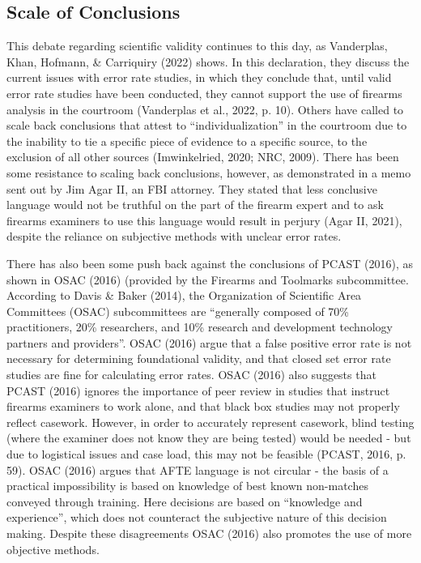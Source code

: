 \documentclass[print]{nuthesis}
\begin{document}
\hypertarget{scale-of-conclusions}{%
\subsection{Scale of Conclusions}\label{scale-of-conclusions}}

This debate regarding scientific validity continues to this day, as Vanderplas, Khan, Hofmann, \& Carriquiry (2022) shows.
In this declaration, they discuss the current issues with error rate studies, in which they conclude that, until valid error rate studies have been conducted, they cannot support the use of firearms analysis in the courtroom (Vanderplas et al., 2022, p. 10).
Others have called to scale back conclusions that attest to ``individualization'' in the courtroom due to the inability to tie a specific piece of evidence to a specific source, to the exclusion of all other sources (Imwinkelried, 2020; NRC, 2009).
There has been some resistance to scaling back conclusions, however, as demonstrated in a memo sent out by Jim Agar II, an FBI attorney.
They stated that less conclusive language would not be truthful on the part of the firearm expert and to ask firearms examiners to use this language would result in perjury (Agar II, 2021), despite the reliance on subjective methods with unclear error rates.

There has also been some push back against the conclusions of PCAST (2016), as shown in OSAC (2016) (provided by the Firearms and Toolmarks subcommittee.
According to Davis \& Baker (2014), the Organization of Scientific Area Committees (OSAC) subcommittees are ``generally composed of 70\% practitioners, 20\% researchers, and 10\% research and development technology partners and providers''.
OSAC (2016) argue that a false positive error rate is not necessary for determining foundational validity, and that closed set error rate studies are fine for calculating error rates.
OSAC (2016) also suggests that PCAST (2016) ignores the importance of peer review in studies that instruct firearms examiners to work alone, and that black box studies may not properly reflect casework.
However, in order to accurately represent casework, blind testing (where the examiner does not know they are being tested) would be needed - but due to logistical issues and case load, this may not be feasible (PCAST, 2016, p. 59).
OSAC (2016) argues that AFTE language is not circular - the basis of a practical impossibility is based on knowledge of best known non-matches conveyed through training.
Here decisions are based on ``knowledge and experience'', which does not counteract the subjective nature of this decision making.
Despite these disagreements OSAC (2016) also promotes the use of more objective methods.
\end{document}
